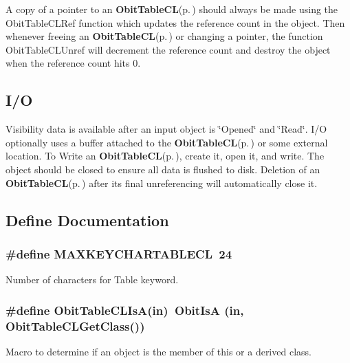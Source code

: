 A copy of a pointer to an {\bf Obit\-Table\-CL}{\rm (p.\,\pageref{structObitTableCL})} should always be made using the Obit\-Table\-CLRef function which updates the reference count in the object. Then whenever freeing an {\bf Obit\-Table\-CL}{\rm (p.\,\pageref{structObitTableCL})} or changing a pointer, the function Obit\-Table\-CLUnref will decrement the reference count and destroy the object when the reference count hits 0.\subsection{I/O}\label{ObitTableCL_8h_ObitTableCLUsage}
Visibility data is available after an input object is \char`\"{}Opened\char`\"{} and \char`\"{}Read\char`\"{}. I/O optionally uses a buffer attached to the {\bf Obit\-Table\-CL}{\rm (p.\,\pageref{structObitTableCL})} or some external location. To Write an {\bf Obit\-Table\-CL}{\rm (p.\,\pageref{structObitTableCL})}, create it, open it, and write. The object should be closed to ensure all data is flushed to disk. Deletion of an {\bf Obit\-Table\-CL}{\rm (p.\,\pageref{structObitTableCL})} after its final unreferencing will automatically close it.

\subsection{Define Documentation}
\subsubsection{\setlength{\rightskip}{0pt plus 5cm}\#define MAXKEYCHARTABLECL\ 24}\label{ObitTableCL_8h_a0}


Number of characters for Table keyword. 

\subsubsection{\setlength{\rightskip}{0pt plus 5cm}\#define Obit\-Table\-CLIs\-A(in)\ Obit\-Is\-A (in, Obit\-Table\-CLGet\-Class())}\label{ObitTableCL_8h_a3}


Macro to determine if an object is the member of this or a derived class. 

